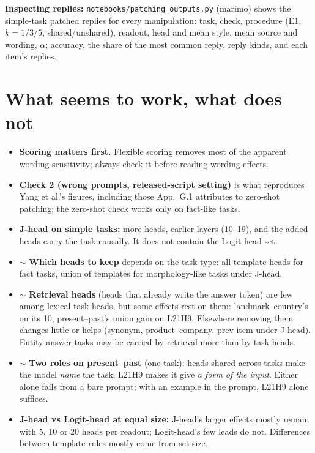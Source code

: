\documentclass[10pt,a4paper]{article}
\newcommand{\yes}{\textcolor{green!45!black}{\ding{51}}}
\newcommand{\mixed}{\textcolor{orange!80!black}{$\sim$}}
\begin{document}
\textbf{Inspecting replies:} \texttt{notebooks/patching\_outputs.py} (marimo) shows the simple-task patched replies for every manipulation: task, check, procedure (E1, $k=1/3/5$, shared/unshared), readout, head and mean style, mean source and wording, $\alpha$; accuracy, the share of the most common reply, reply kinds, and each item's replies.

\section{What seems to work, what does not}

\begin{itemize}
\item \yes{} \textbf{Scoring matters first.} Flexible scoring removes most of the apparent wording sensitivity; always check it before reading wording effects.
\item \yes{} \textbf{Check 2 (wrong prompts, released-script setting)} is what reproduces Yang et al.'s figures, including those App.~G.1 attributes to zero-shot patching; the zero-shot check works only on fact-like tasks.
\item \yes{} \textbf{J-head on simple tasks:} more heads, earlier layers (10--19), and the added heads carry the task causally. It does not contain the Logit-head set.
\item \mixed{} \textbf{Which heads to keep} depends on the task type: all-template heads for fact tasks, union of templates for morphology-like tasks under J-head.
\item \mixed{} \textbf{Retrieval heads} (heads that already write the answer token) are few among lexical task heads, but some effects rest on them: landmark--country's on its 10, present--past's union gain on L21H9. Elsewhere removing them changes little or helps (synonym, product--company, prev-item under J-head). Entity-answer tasks may be carried by retrieval more than by task heads.
\item \mixed{} \textbf{Two roles on present--past} (one task): heads shared across tasks make the model \emph{name} the task; L21H9 makes it give \emph{a form of the input}. Either alone fails from a bare prompt; with an example in the prompt, L21H9 alone suffices.
\item \yes{} \textbf{J-head vs Logit-head at equal size:} J-head's larger effects mostly remain with 5, 10 or 20 heads per readout; Logit-head's few leads do not. Differences between template rules mostly come from set size.

\end{itemize}
\end{document}
